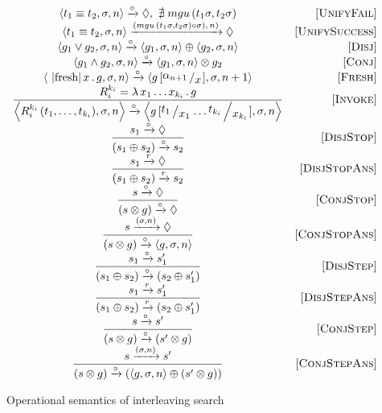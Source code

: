 \begin{figure*}[t]
  \renewcommand{\arraystretch}{1.6}
  \[
  \begin{array}{cr}
    \inbr{t_1 \equiv t_2, \sigma, n} \xrightarrow{\step} \Diamond , \, \, \nexists\; mgu\,(t_1 \sigma, t_2 \sigma) &\ruleno{UnifyFail} \\
    \inbr{t_1 \equiv t_2, \sigma, n} \xrightarrow{(mgu\,(t_1 \sigma, t_2 \sigma) \circ \sigma),\, n)} \Diamond & \ruleno{UnifySuccess} \\
    \inbr{g_1 \lor g_2, \sigma, n} \xrightarrow{\step} \inbr{g_1, \sigma, n} \oplus \inbr{g_2, \sigma, n} & \ruleno{Disj} \\
    \inbr{g_1 \land g_2, \sigma, n} \xrightarrow{\step} \inbr{ g_1, \sigma, n} \otimes g_2 & \ruleno{Conj} \\
    \inbr{\mbox{\lstinline|fresh|}\, x\, .\, g, \sigma, n} \xrightarrow{\step} \inbr{g\,[\bigslant{\alpha_{n + 1}}{x}], \sigma, n + 1} & \ruleno{Fresh} \\
    \dfrac{R_i^{k_i}=\lambda\,x_1\dots x_{k_i}\,.\,g}{\inbr{R_i^{k_i}\,(t_1,\dots,t_{k_i}),\sigma,n} \xrightarrow{\step} \inbr{g\,[\bigslant{t_1}{x_1}\dots\bigslant{t_{k_i}}{x_{k_i}}], \sigma, n}} & \ruleno{Invoke}\\
    \dfrac{s_1 \xrightarrow{\step} \Diamond}{(s_1 \oplus s_2) \xrightarrow{\step} s_2} & \ruleno{DisjStop}\\
    \dfrac{s_1 \xrightarrow{r} \Diamond}{(s_1 \oplus s_2) \xrightarrow{r} s_2} & \ruleno{DisjStopAns}\\
    \dfrac{s \xrightarrow{\step} \Diamond}{(s \otimes g) \xrightarrow{\step} \Diamond} &\ruleno{ConjStop}\\
    \dfrac{s \xrightarrow{(\sigma, n)} \Diamond}{(s \otimes g) \xrightarrow{\step} \inbr{g, \sigma, n}}  & \ruleno{ConjStopAns}\\
    \dfrac{s_1 \xrightarrow{\step} s'_1}{(s_1 \oplus s_2) \xrightarrow{\step} (s_2 \oplus s'_1)} &\ruleno{DisjStep}\\
    \dfrac{s_1 \xrightarrow{r} s'_1}{(s_1 \oplus s_2) \xrightarrow{r} (s_2 \oplus s'_1)} &\ruleno{DisjStepAns}\\
    \dfrac{s \xrightarrow{\step} s'}{(s \otimes g) \xrightarrow{\step} (s' \otimes g)} &\ruleno{ConjStep}\\
    \dfrac{s \xrightarrow{(\sigma, n)} s'}{(s \otimes g) \xrightarrow{\step} (\inbr{g, \sigma, n} \oplus (s' \otimes g))} & \ruleno{ConjStepAns} 
  \end{array}
  \]
  \caption{Operational semantics of interleaving search}
  \label{lts}
\end{figure*}

